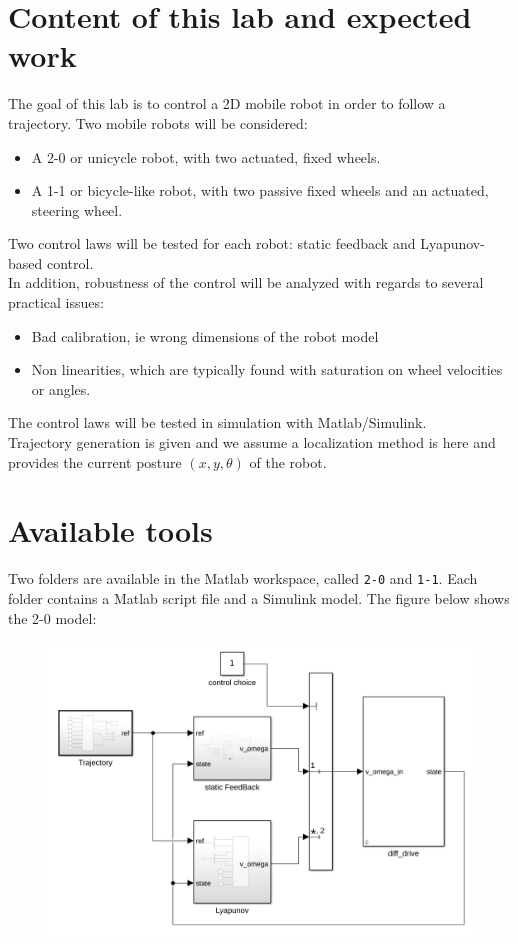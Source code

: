 \documentclass{ecnreport}
\begin{document}



\section{Content of this lab and expected work}

The goal of this lab is to control a 2D mobile robot in order to follow a trajectory. Two mobile robots will be considered:
\begin{itemize}
 \item A 2-0 or unicycle robot, with two actuated, fixed wheels.
 \item A 1-1 or bicycle-like robot, with two passive fixed wheels and an actuated, steering wheel.
\end{itemize}

Two control laws will be tested for each robot: static feedback and Lyapunov-based control.\\

In addition, robustness of the control will be analyzed with regards to several practical issues:
\begin{itemize}
 \item Bad calibration, ie wrong dimensions of the robot model 
 \item Non linearities, which are typically found with saturation on wheel velocities or angles.
\end{itemize}

The control laws will be tested in simulation with Matlab/Simulink.\\
Trajectory generation is given and we assume a localization method is here and provides the current posture $(x,y,\theta)$  of the robot. 

\section{Available tools}

Two folders are available in the Matlab workspace, called \texttt{2-0} and \texttt{1-1}.
Each folder contains a Matlab script file and a Simulink model. The figure below shows the 2-0 model:
\begin{figure}[h]\centering
 \includegraphics[width=.64\linewidth]{simulink}
\end{figure}
\end{document}
